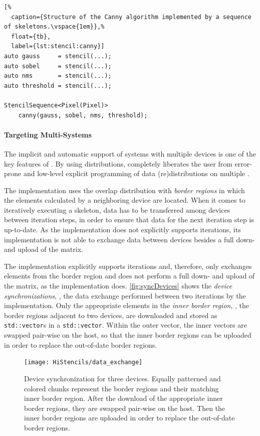 \begin{lstlisting}[%
  caption={Structure of the Canny algorithm implemented by a sequence of skeletons.\vspace{1em}},%
  float={tb},
  label={lst:stencil:canny}]
auto gauss     = stencil(...);
auto sobel     = stencil(...);
auto nms       = stencil(...);
auto threshold = stencil(...);

StencilSequence<Pixel(Pixel)>
    canny(gauss, sobel, nms, threshold);
\end{lstlisting}

\paragraph{Targeting Multi-\GPU Systems}
The implicit and automatic support of systems with multiple \OpenCL devices is one of the key features of \SkelCL.
By using distributions, \SkelCL completely liberates the user from error-prone and low-level explicit programming of data (re)distributions on multiple \GPUs. 

The  implementation uses the overlap distribution with \textit{border regions} in which the elements calculated by a neighboring device are located.
When it comes to iteratively executing a skeleton, data has to be transferred among devices between iteration steps, in order to ensure that data for the next iteration step is up-to-date.
As the  implementation does not explicitly supports iterations, its implementation is not able to exchange data between devices besides a full down- and upload of the matrix.

The  implementation explicitly supports iterations and, therefore, only exchanges elements from the border region and does not perform a full down- and upload of the matrix, as the  implementation does.
\autoref{fig:syncDevices} shows the \textit{device synchronizations}, \ie, the data exchange performed between two iterations by the  implementation.
Only the appropriate elements in the \emph{inner border region}, \ie, the border regions adjacent to two \OpenCL devices, are downloaded and stored as \texttt{std::vector}s in a \texttt{std::vector}.
Within the outer vector, the inner vectors are swapped pair-wise on the host, so that the inner border regions can be uploaded in order to replace the out-of-date border regions.

\begin{figure}[tb]
  \centering
  \texttt{[image: HiStencils/data\_exchange]}
  \caption{\small Device synchronization for three devices. Equally patterned and colored chunks represent the border regions and their matching inner border region. After the download of the appropriate inner border regions, they are swapped pair-wise on the host. Then the inner border regions are uploaded in order to replace the out-of-date border regions.}
  \label{fig:syncDevices}
  \vspace{1em}
\end{figure}


